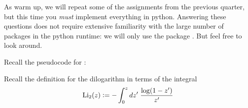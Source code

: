 \documentclass[12pt,answers]{exam}
\begin{document}
\pagestyle{headandfoot}
\runningfootrule
{}
\runningheader{}{}{}
\firstpagefooter{}{}{}

As warm up, we will repeat some of the assignments from the previous quarter, but this time you
\emph{must} implement everything in python. Answering these questions does not require
extensive familiarity with the large number of packages in the python runtime: we will only use
the package . But feel free to look around.

\begin{questions}

\question
Recall the pseudocode for \mergesort:
%
\begin{center}
  \begin{minipage}{.5\linewidth}
    \begin{algorithm}[H]
      \label{alg:merge-sort}
%
      \DontPrintSemicolon
      \SetAlCapHSkip{0ex}
%
      \caption{\mergesort($S$, $p$, $r$)}
      \vspace{.5em}
%
%
      \vspace{.5em}
%
    \end{algorithm}
  \end{minipage}
\end{center}
%

\def\Li{\mbox{\rm Li}_{2}}
\def\dilog{\function{dilog}}
\question Recall the definition for the dilogarithm in terms of the integral
%
\begin{equation}
\Li(z) \bydef
- \int_{0}^{z} dz' \; \frac{\log(1-z')}{z'} \label{eq:li-def}
\end{equation}
%
\begin{parts}

\end{parts}
\end{questions}
\end{document}
